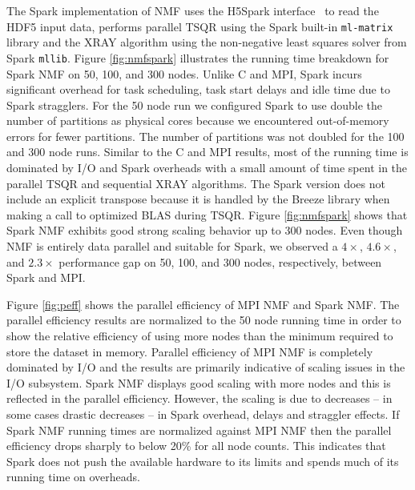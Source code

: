 The Spark implementation of NMF uses the H5Spark interface~\cite{h5spark-cug16} to read the HDF5 input data, performs parallel TSQR using the Spark built-in \verb+ml-matrix+ library and the XRAY algorithm using the non-negative least squares solver from Spark \verb+mllib+. Figure \ref{fig:nmfspark} illustrates the running time breakdown for Spark NMF on 50, 100, and 300 nodes. Unlike C and MPI, Spark incurs significant overhead for task scheduling, task start delays and idle time due to Spark stragglers. For the 50 node run we configured Spark to use double the number of partitions as physical cores because we encountered out-of-memory errors for fewer partitions. The number of partitions was not doubled for the 100 and 300 node runs. Similar to the C and MPI results, most of the running time is dominated by I/O and Spark overheads with a small amount of time spent in the parallel TSQR and sequential XRAY algorithms. The Spark version does not include an explicit transpose because it is handled by the Breeze library when making a call to optimized BLAS during TSQR. Figure \ref{fig:nmfspark} shows that Spark NMF exhibits good strong scaling behavior up to 300 nodes.  Even though NMF is entirely data parallel and suitable for Spark, we observed a $4\times$, $4.6\times$, and $2.3\times$ performance gap on 50, 100, and 300 nodes, respectively, between Spark and MPI.

Figure \ref{fig:peff} shows the parallel efficiency of MPI NMF and Spark NMF. The parallel efficiency results are normalized to the 50 node running time in order to show the relative efficiency of using more nodes than the minimum required to store the dataset in memory. Parallel efficiency of MPI NMF is completely dominated by I/O and the results are primarily indicative of scaling issues in the I/O subsystem. Spark NMF displays good scaling with more nodes and this is reflected in the parallel efficiency. However, the scaling is due to decreases -- in some cases drastic decreases --  in Spark overhead, delays and straggler effects. If Spark NMF running times are normalized against MPI NMF then the parallel efficiency drops sharply to below 20\% for all node counts. This indicates that Spark does not push the available hardware to its limits and spends much of its running time on overheads.


